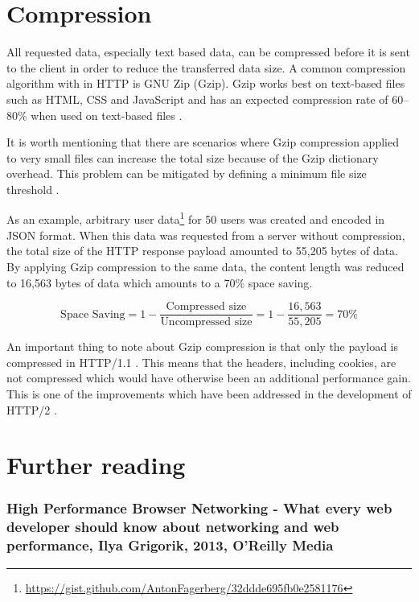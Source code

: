 \documentclass{cslthse-msc}
\begin{document}
\section{Compression}
\label{compression_more}

All requested data, especially text based data, can be compressed before it is sent to the client in order to reduce the transferred data size. A common compression algorithm with in HTTP is GNU Zip (Gzip). Gzip works best on text-based files such as HTML, CSS and JavaScript and has an expected compression rate of 60--80\% when used on text-based files \cite[page 237]{HPBN}.

It is worth mentioning that there are scenarios where Gzip compression applied to very small files can increase the total size because of the Gzip dictionary overhead. This problem can be mitigated by defining a minimum file size threshold \cite{google_gzip}.

As an example, arbitrary user data\footnote{\url{https://gist.github.com/AntonFagerberg/32ddde695fb0e2581176}} for 50 users was created and encoded in JSON format. When this data was requested from a server without compression, the total size of the HTTP response payload amounted to 55,205 bytes of data. By applying Gzip compression to the same data, the content length was reduced to 16,563 bytes of data which amounts to a 70\% space saving. 

\begin{equation}
\mbox{Space Saving} = 1 - \frac{\mbox{Compressed size}}{\mbox{Uncompressed size}} = 1 - \frac{16,563}{55,205} = 70\%
\end{equation}

An important thing to note about Gzip compression is that only the payload is compressed in HTTP/1.1 \cite{rfc2616}. This means that the headers, including cookies, are not compressed which would have otherwise been an additional performance gain. This is one of the improvements which have been addressed in the development of HTTP/2 \cite[page 19]{hpbn2}.

\section{Further reading}
\subsubsection{High Performance Browser Networking - What every web developer should know about networking and web performance, Ilya Grigorik, 2013, O'Reilly Media}
\end{document}

